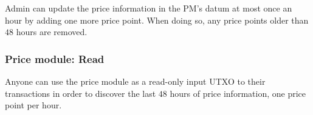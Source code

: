 \documentclass{article} %
\begin{document}
Admin can update the price information in the PM's datum at most once an hour by
adding one more price point.
When doing so, any price points older than $48$ hours are removed.

\subsubsection*{Price module: Read}

Anyone can use the price module as a read-only input UTXO to their transactions
in order to discover the last $48$ hours of price information, one price point
per hour.

% 
% 
% 
% 
\end{document}
